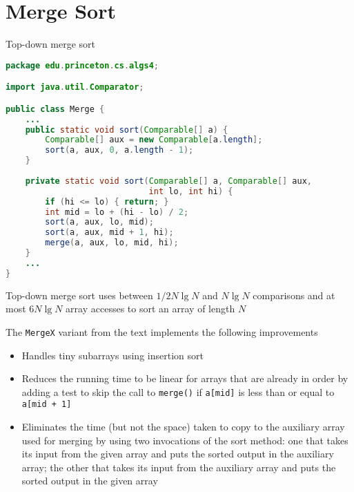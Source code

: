 \documentclass[8pt,a4paper,compress]{beamer}
\begin{document}
\section{Merge Sort}
\begin{frame}[fragile]
Top-down merge sort

\begin{lstlisting}[language=Java]
package edu.princeton.cs.algs4;

import java.util.Comparator;

public class Merge {
    ...
    public static void sort(Comparable[] a) {
        Comparable[] aux = new Comparable[a.length]; 
        sort(a, aux, 0, a.length - 1);
    }
    
    private static void sort(Comparable[] a, Comparable[] aux, 
                             int lo, int hi) {
        if (hi <= lo) { return; }
        int mid = lo + (hi - lo) / 2;
        sort(a, aux, lo, mid); 
        sort(a, aux, mid + 1, hi); 
        merge(a, aux, lo, mid, hi);
    }
    ...
}
\end{lstlisting}
\end{frame}

\begin{frame}[fragile]
\begin{center}
\texttt{[image: \{./figures/mergetd\_trace]}.pdf}

\smallskip

\tiny Top-down merge sort
\end{center}
\end{frame}

\begin{frame}[fragile]
Top-down merge sort uses between $1/2N\lg N$ and $N\lg N$ comparisons and at most $6N\lg N$ array accesses to sort an array of length $N$

\bigskip

The \lstinline$MergeX$ variant from the text implements the following improvements

\begin{itemize}
\item Handles tiny subarrays using insertion sort

\item Reduces the running time to be linear for arrays that are already in order by adding a test to skip the call to \lstinline$merge()$ if \lstinline$a[mid]$ is less than or equal to \lstinline$a[mid + 1]$

\item Eliminates the time (but not the space) taken to copy to the auxiliary array used for merging by using two invocations of the sort method: one that takes its input from the given array and puts the sorted output in the auxiliary array; the other that takes its input from the auxiliary array and puts the sorted output in the given array
\end{itemize}
\end{frame}
\end{document}
